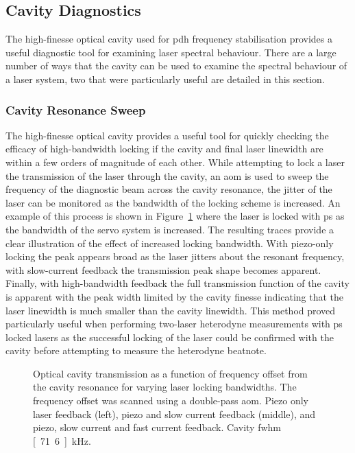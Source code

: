 \subsection{Cavity Diagnostics}

The high-finesse optical cavity used for \gls{pdh} frequency stabilisation provides a useful diagnostic tool for examining laser spectral behaviour.
There are a large number of ways that the cavity can be used to examine the spectral behaviour of a laser system, two that were particularly useful are detailed in this section.

\subsubsection{Cavity Resonance Sweep}

The high-finesse optical cavity provides a useful tool for quickly checking the efficacy of high-bandwidth locking if the cavity and final laser linewidth are within a few orders of magnitude of each other.
While attempting to lock a laser the transmission of the laser through the cavity, an \gls{aom} is used to sweep the frequency of the diagnostic beam across the cavity resonance, the jitter of the laser can be monitored as the bandwidth of the locking scheme is increased.
An example of this process is shown in Figure~\ref{figure:cavity_scans} where the laser is locked with \gls{ps} as the bandwidth of the servo system is increased.
The resulting traces provide a clear illustration of the effect of increased locking bandwidth.
With piezo-only locking the peak appears broad as the laser jitters about the resonant frequency, with slow-current feedback the transmission peak shape becomes apparent.
Finally, with high-bandwidth feedback the full transmission function of the cavity is apparent with the peak width limited by the cavity finesse indicating that the laser linewidth is much smaller than the cavity linewidth.
This method proved particularly useful when performing two-laser heterodyne measurements with \gls{ps} locked lasers as the successful locking of the laser could be confirmed with the cavity before attempting to measure the heterodyne beatnote.

\begin{figure}
\center

\caption[Optical cavity transmission demonstrating laser frequency lock bandwidths.]{Optical cavity transmission as a function of frequency offset from the cavity resonance for varying laser locking bandwidths. The frequency offset was scanned using a double-pass \gls{aom}. Piezo only laser feedback (left), piezo and slow current feedback (middle), and piezo, slow current and fast current feedback. Cavity \gls{fwhm} \unit[71.6]{kHz}.}
\label{figure:cavity_scans}
\end{figure}

